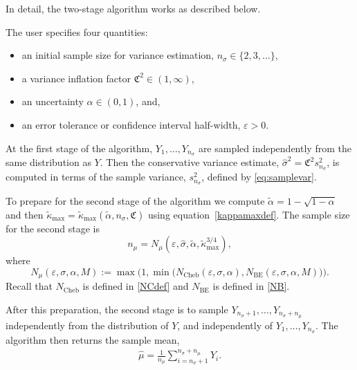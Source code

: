 \documentclass[graybox]{svmult}
\newcommand{\fudge}{\mathfrak{C}}
\newcommand{\hmu}{\hat{\mu}}
\newcommand{\hsigma}{\hat{\sigma}}
\begin{document}
In detail, the two-stage algorithm works
as described below.


\begin{algo} \label{twostagealgo} The user specifies
four quantities:
\begin{itemize}
\item 
an initial sample size for variance estimation, $n_\sigma \in \{2,3, \ldots\}$,
\item
a variance inflation factor $\fudge^2\in(1,\infty)$,
\item
an uncertainty $\alpha\in(0,1)$, and,
\item
an error tolerance or confidence interval half-width, $\varepsilon>0$.
\end{itemize}

At the first stage of the algorithm,
$Y_1,\dots,Y_{n_\sigma}$ are sampled independently
from the same distribution as $Y$.
Then the conservative variance estimate, $\hat\sigma^2 = \fudge^2 s^2_{n_\sigma}$,
is computed in terms of the sample variance, $s^2_{n_\sigma}$, defined by \eqref{eq:samplevar}.

To prepare for the second stage of the algorithm
we compute $\tilde\alpha = 1-\sqrt{1-\alpha}$
and then $\tilde\kappa_{\max} = \tilde\kappa_{\max}(\tilde\alpha,n_\sigma,\fudge)$
using equation~\eqref{kappamaxdef}.
The sample size for the second stage is
\begin{equation} \label{nmudef}
n_\mu = N_{\mu}(\varepsilon,\hsigma,\tilde\alpha,\tilde\kappa_{\max}^{3/4}),
\end{equation}
where
\begin{equation} \label{NCBdef}
N_{\mu}(\varepsilon,\sigma,\alpha,M) 
:= \max\bigl(1,\min\bigl(N_{\text{Cheb}}(\varepsilon,\sigma,\alpha), 
N_{\text{BE}}(\varepsilon,\sigma,\alpha,M) \bigr) \bigr).
\end{equation} 
Recall that
$N_{\text{Cheb}}$ is defined in \eqref{NCdef} and  $N_{\text{BE}}$ 
is defined in \eqref{NB}.  

After this preparation, the second stage is to sample
$Y_{n_\sigma+1},\dots,Y_{n_\sigma+n_\mu}$ independently
from the distribution of $Y$, and independently of $Y_{1},\dots,Y_{n_\sigma}$.  The algorithm then returns the sample mean,
\begin{align}\label{eq:theestimate}
\hmu = \frac1{n_\mu}\sum_{i=n_\sigma+1}^{n_\sigma+n_\mu}Y_i.
\end{align}
\end{algo}

\bigskip
\end{document}
